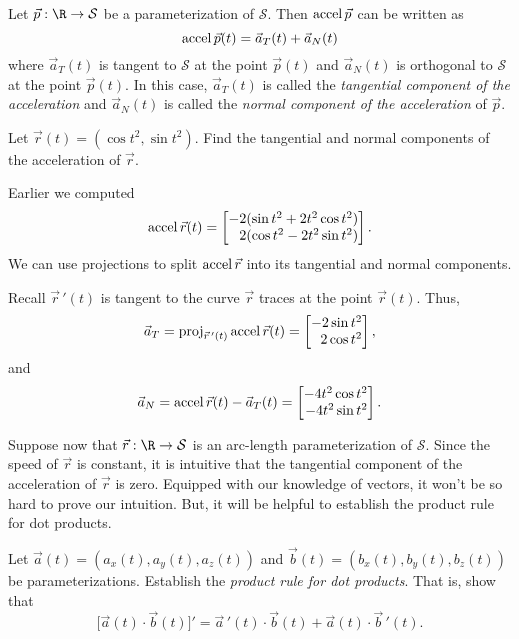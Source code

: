 \begin{definition}
	Let $\vec p:\R\to\mathcal S$ be a parameterization of $\mathcal S$.  Then
	$\operatorname{accel} \vec p$ can be written as
	\[
		\operatorname{accel} \vec p(t) = \vec a_T(t)+\vec a_N(t)
	\]
	where $\vec a_T(t)$ is tangent to $\mathcal S$ at the point $\vec p(t)$ and $\vec a_N(t)$
	is orthogonal to $\mathcal S$ at the point $\vec p(t)$.  In this case, $\vec a_T(t)$ is
	called the \emph{tangential component of the acceleration} and $\vec a_N(t)$ is
	called the \emph{normal component of the acceleration} of $\vec p$.
\end{definition}

\begin{example}
	Let $\vec r(t)=(\cos t^2,\sin t^2)$.  Find the tangential and normal components of
	the acceleration of $\vec r$.

	Earlier we computed
	\[
		\Accel \vec r(t) = \mat{-2(\sin t^2+2t^2\cos t^2)\\ 2(\cos t^2-2t^2\sin t^2)}.
	\]
	We can use projections to split $\operatorname{accel} \vec r$ into its tangential and normal components.

	Recall $\vec r\,'(t)$ is tangent to the curve $\vec r$ traces at the point $\vec r(t)$.  Thus,
	\[
		\vec a_T = \Proj_{\vec r\,'(t)} \Accel \vec r(t) = \mat{-2\sin t^2\\ 2\cos t^2},
	\]
	and 
	\[
		\vec a_N = \Accel\vec r(t) - \vec a_T(t) = \mat{-4t^2\cos t^2\\ -4t^2\sin t^2}.
	\]
\end{example}

Suppose now that $\vec r:\R\to\mathcal S$ is an arc-length parameterization of $\mathcal S$.  Since
the speed of $\vec r$ is constant, it is intuitive that the tangential component of 
the acceleration of $\vec r$ is zero.  Equipped with our knowledge of vectors, it won't be
so hard to prove our intuition.  But, it will be helpful to establish the product rule
for dot products.

\begin{exercise}
	Let $\vec a(t)=(a_x(t),a_y(t),a_z(t))$ and $\vec b(t)=(b_x(t),b_y(t),b_z(t))$ be parameterizations.
	Establish the \emph{product rule for dot products}.  That is,
	show that
	\[
		\Big[\vec a(t)\cdot \vec b(t)\Big]' = \vec a\,'(t)\cdot \vec b(t)+\vec a(t)\cdot \vec b\,'(t).
	\]
\end{exercise}

